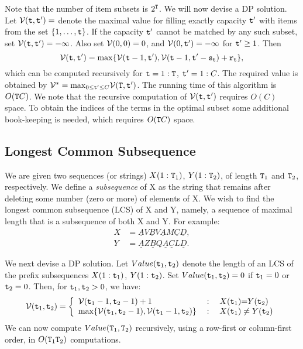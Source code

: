 Note that the number of item subsets is ${2^{\tt T}}$. We will now devise a DP solution.
Let $\mathcal{V}({\tt t},{\tt t}') = $ denote the maximal value for filling exactly capacity ${\tt t}'$ with items from the set $\{1, \ldots,{\tt t}\}$.
If the capacity ${\tt t}'$ cannot be matched by any such subset, set $\mathcal{V}({\tt t},{\tt t}') =  - \infty $.
Also set $\mathcal{V}(0,0) = 0$, and  $\mathcal{V}(0,{\tt t}') =  - \infty $ for ${\tt t}' \ge 1$.  Then
\begin{equation*}
  \mathcal{V}({\tt t},{\tt t}') = \max \{ \mathcal{V}({\tt t} - 1,{\tt t}'), \mathcal{V}({\tt t} - 1,{\tt t}' - {{\tt s}_{{\tt t}}}) + {{\tt r}_{{\tt t}}}\},  
\end{equation*}
which can be computed recursively for ${\tt t} = 1:{\tt T}$,  ${\tt t}' = 1:C$. The required value is obtained by    $\mathcal{V}^* = {\max _{0 \le {\tt t}' \le C}}\mathcal{V}({\tt T},{\tt t}')$.
The running time of this algorithm is $O({\tt T} C)$.  We note that the recursive computation of $\mathcal{V}({\tt t},{\tt t}')$ requires $O(C)$ space. To obtain the indices of the terms in the optimal subset some additional book-keeping is needed, which requires $O({\tt T} C)$  space.

\subsection*{Longest Common Subsequence}\label{ss:LCS}
We are given two sequences (or strings) $X(1:{\tt T}_1)$, $Y(1:{\tt T}_2)$, of length ${\tt T}_1$ and ${\tt T}_2$, respectively. We define a \textit{subsequence} of X as the string that remains after deleting some number (zero or more) of elements of X.  We wish to find the longest common subsequence (LCS) of X and Y, namely, a sequence of maximal length that is a subsequence of both X and Y.
For example:
\begin{equation*}
    \begin{split}
       X &= \underline{A}V\underline{B}V\underline{A}M\underline{C}\underline{D}, \\
       Y &= \underline{A}Z\underline{B}Q\underline{A}\underline{C}L\underline{D}.
     \end{split}
\end{equation*}

We next devise a DP solution.
Let  $Value({\tt t}_1,{\tt t}_2)$ denote the length of an LCS of  the prefix subsequences $X(1:{\tt t}_1)$, $Y(1:{\tt t}_2)$. Set $Value({\tt t}_1,{\tt t}_2) = 0$ if ${\tt t}_1 = 0$ or ${\tt t}_2 = 0$. Then, for ${\tt t}_1,{\tt t}_2 > 0$, we have:
\begin{equation*}
    \Value(\ttime_1,\ttime_2) = \left\{ {\begin{array}{*{20}{l}}
    {\Value(\ttime_1 - 1,\ttime_2 - 1) + 1}&{\;:\quad X(\ttime_1){\rm{ = }}Y(\ttime_2){\rm{  }}}\\
{\max \{ \Value(\ttime_1,\ttime_2 - 1),\Value(\ttime_1 - 1,\ttime_2)\} }&{\;:\quad X(\ttime_1) \ne Y(\ttime_2)}
\end{array}} \right.
\end{equation*}
We can now compute $Value({\tt T}_1, {\tt T}_2)$ recursively, using a row-first or column-first order, in $O({\tt T}_1 {\tt T}_2)$ computations.


